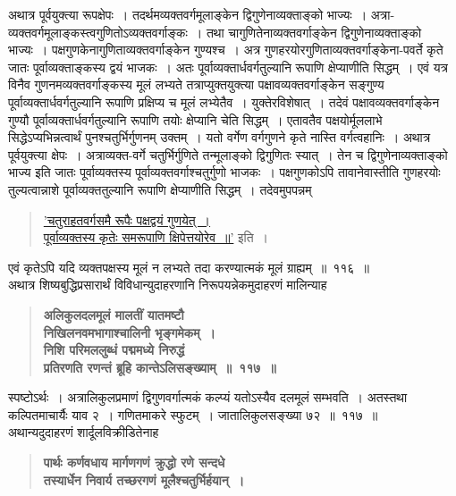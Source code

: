 \documentclass[11pt, openany]{book}
\begin{document}
\newpage

\begin{sloppypar}
अथात्र पूर्वयुक्त्या रूपक्षेपः~। तदर्थमव्यक्तवर्गमूलाङ्केन द्विगुणेनाव्यक्ताङ्को भाज्यः~। अत्रा-व्यक्तवर्गमूलाङ्कस्त्वगुणितोऽव्यक्तवर्गाङ्कः~। तथा चागुणितेनाव्यक्तवर्गाङ्केन द्विगुणेनाव्यक्ताङ्को भाज्यः~। पक्षगुणकेनागुणिताव्यक्तवर्गाङ्केन गुण्यश्च~। अत्र गुणहरयोरगुणिताव्यक्तवर्गाङ्केना-पवर्ते कृते जातः पूर्वाव्यक्ताङ्कस्य द्वयं भाजकः~। अतः पूर्वाव्यक्तार्धवर्गतुल्यानि रूपाणि क्षेप्याणीति सिद्धम्~। एवं यत्र विनैव गुणनमव्यक्तवर्गाङ्कस्य मूलं लभ्यते तत्राप्युक्तयुक्त्या पक्षावव्यक्तवर्गाङ्केन सङ्गुण्य पूर्वाव्यक्तार्धवर्गतुल्यानि रूपाणि प्रक्षिप्य च मूलं लभ्येतैव~। युक्तेरविशेषात्~। तदेवं पक्षावव्यक्तवर्गाङ्केन गुण्यौ पूर्वाव्यक्तार्धवर्गतुल्यानि रूपाणि तयोः क्षेप्यानि चेति सिद्धम्~। एतावतैव पक्षयोर्मूललाभे सिद्धेऽप्यभिन्नत्वार्थं पुनश्चतुर्भिर्गुणनम् उक्तम्~। यतो वर्गेण वर्गगुणने कृते नास्ति वर्गत्वहानिः~। अथात्र पूर्वयुक्त्या क्षेपः~। अत्राव्यक्त-वर्गे चतुर्भिर्गुणिते तन्मूलाङ्को द्विगुणितः स्यात्~। तेन च द्विगुणेनाव्यक्ताङ्को भाज्य इति जातः पूर्वाव्यक्तस्य पूर्वाव्यक्तवर्गाश्चतुर्गुणो भाजकः~। पक्षगुणकोऽपि तावानेवास्तीति गुणहरयोः तुल्यत्वान्नाशे पूर्वाव्यक्ततुल्यानि रूपाणि क्षेप्याणीति सिद्धम्~। तदेवमुपपन्नम्\textendash
\vspace{-1mm}

\begin{quote}
\hyperref[8.116]{'चतुराहतवर्गसमै रूपैः पक्षद्वयं गुणयेत्~।\\
पूर्वाव्यक्तस्य कृतेः समरूपाणि क्षिपेत्तयोरेव~॥'} इति~।
\end{quote}
\vspace{-1mm}

एवं कृतेऽपि यदि व्यक्तपक्षस्य मूलं न लभ्यते तदा करण्यात्मकं मूलं ग्राह्यम्~॥~११६~॥\\

{\small अथात्र शिष्यबुद्धिप्रसारार्थं विविधान्युदाहरणानि निरूपयन्नेकमुदाहरणं मालिन्याह\textendash }

 \label{8.117}
\begin{quote}
{\large \textbf{{\color{purple}अलिकुलदलमूलं मालतीं यातमष्टौ\\
निखिलनवमभागाश्चालिनी भृङ्गमेकम्~।\\
निशि परिमललुब्धं पद्ममध्ये निरुद्धं\\
प्रतिरणति रणन्तं ब्रूहि कान्तेऽलिसङ्ख्याम्~॥~११७~॥}}}
\end{quote}

स्पष्टोऽर्थः~। अत्रालिकुलप्रमाणं द्विगुणवर्गात्मकं कल्प्यं यतोऽस्यैव दलमूलं सम्भवति~। अतस्तथा कल्पितमाचार्यैः याव २~। गणितमाकरे स्फुटम्~। जातालिकुलसङ्ख्या ७२~॥~११७~॥\\

{\small अथान्यदुदाहरणं शार्दूलविक्रीडितेनाह\textendash }

 \label{8.118.1}
\begin{quote}
{\large \textbf{{\color{purple}पार्थः कर्णवधाय मार्गणगणं क्रुद्धो रणे सन्दधे\\
तस्यार्धेन निवार्य तच्छरगणं मूलैश्चतुर्भिर्हयान्~।}}}
\end{quote}
\end{sloppypar}
\end{document}

